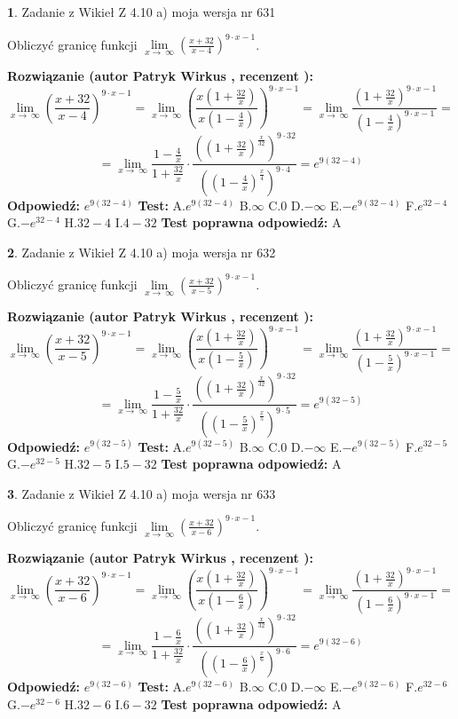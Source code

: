 \documentclass[12pt, a4paper]{article}
\theoremstyle{definition} %
\newtheorem{zad}{}
\newcommand{\zadStart}[1]{\begin{zad}#1\newline}
\newcommand{\zadStop}{\end{zad}}
\newcommand{\rozwStart}[2]{\noindent \textbf{Rozwiązanie (autor #1 , recenzent #2): }\newline}
\newcommand{\rozwStop}{\newline}
\newcommand{\odpStart}{\noindent \textbf{Odpowiedź:}\newline}
\newcommand{\odpStop}{\newline}
\newcommand{\testStart}{\noindent \textbf{Test:}\newline}
\newcommand{\testStop}{\newline}
\newcommand{\kluczStart}{\noindent \textbf{Test poprawna odpowiedź:}\newline}
\newcommand{\kluczStop}{\newline}
\begin{document}
\zadStart{Zadanie z Wikieł Z 4.10 a) moja wersja nr 631}


Obliczyć granicę funkcji  $\lim\limits_{x\to\ \infty}(\frac{x+32}{x-4})^{9\cdot x-1}$.
\zadStop
\rozwStart{Patryk Wirkus}{}
$$\lim\limits_{x\to\ \infty}(\frac{x+32}{x-4})^{9\cdot x-1} = \lim\limits_{x\to\ \infty}(\frac{x(1+\frac{32}{x})}{x(1-\frac{4}{x})})^{9\cdot x-1}=\lim\limits_{x\to\ \infty}\frac{(1+\frac{32}{x})^{9\cdot x-1}}{(1-\frac{4}{x})^{9\cdot x-1}}=$$
$$=\lim\limits_{x\to\ \infty}\frac{1-\frac{4}{x}}{1+\frac{32}{x}}\cdot\frac{((1+\frac{32}{x})^{\frac{x}{32}})^{9\cdot32}}{((1-\frac{4}{x})^{\frac{x}{4}})^{9\cdot4}}=e^{9(32-4)}$$
\rozwStop
\odpStart
$e^{9(32-4)}$
\odpStop
\testStart
A.$e^{9(32-4)}$ B.$\infty$ C.$0$ D.$-\infty$ E.$-e^{9(32-4)}$
F.$e^{32-4}$ G.$-e^{32-4}$
H.$32-4$
I.$4-32$
\testStop
\kluczStart
A
\kluczStop



\zadStart{Zadanie z Wikieł Z 4.10 a) moja wersja nr 632}


Obliczyć granicę funkcji  $\lim\limits_{x\to\ \infty}(\frac{x+32}{x-5})^{9\cdot x-1}$.
\zadStop
\rozwStart{Patryk Wirkus}{}
$$\lim\limits_{x\to\ \infty}(\frac{x+32}{x-5})^{9\cdot x-1} = \lim\limits_{x\to\ \infty}(\frac{x(1+\frac{32}{x})}{x(1-\frac{5}{x})})^{9\cdot x-1}=\lim\limits_{x\to\ \infty}\frac{(1+\frac{32}{x})^{9\cdot x-1}}{(1-\frac{5}{x})^{9\cdot x-1}}=$$
$$=\lim\limits_{x\to\ \infty}\frac{1-\frac{5}{x}}{1+\frac{32}{x}}\cdot\frac{((1+\frac{32}{x})^{\frac{x}{32}})^{9\cdot32}}{((1-\frac{5}{x})^{\frac{x}{5}})^{9\cdot5}}=e^{9(32-5)}$$
\rozwStop
\odpStart
$e^{9(32-5)}$
\odpStop
\testStart
A.$e^{9(32-5)}$ B.$\infty$ C.$0$ D.$-\infty$ E.$-e^{9(32-5)}$
F.$e^{32-5}$ G.$-e^{32-5}$
H.$32-5$
I.$5-32$
\testStop
\kluczStart
A
\kluczStop



\zadStart{Zadanie z Wikieł Z 4.10 a) moja wersja nr 633}


Obliczyć granicę funkcji  $\lim\limits_{x\to\ \infty}(\frac{x+32}{x-6})^{9\cdot x-1}$.
\zadStop
\rozwStart{Patryk Wirkus}{}
$$\lim\limits_{x\to\ \infty}(\frac{x+32}{x-6})^{9\cdot x-1} = \lim\limits_{x\to\ \infty}(\frac{x(1+\frac{32}{x})}{x(1-\frac{6}{x})})^{9\cdot x-1}=\lim\limits_{x\to\ \infty}\frac{(1+\frac{32}{x})^{9\cdot x-1}}{(1-\frac{6}{x})^{9\cdot x-1}}=$$
$$=\lim\limits_{x\to\ \infty}\frac{1-\frac{6}{x}}{1+\frac{32}{x}}\cdot\frac{((1+\frac{32}{x})^{\frac{x}{32}})^{9\cdot32}}{((1-\frac{6}{x})^{\frac{x}{6}})^{9\cdot6}}=e^{9(32-6)}$$
\rozwStop
\odpStart
$e^{9(32-6)}$
\odpStop
\testStart
A.$e^{9(32-6)}$ B.$\infty$ C.$0$ D.$-\infty$ E.$-e^{9(32-6)}$
F.$e^{32-6}$ G.$-e^{32-6}$
H.$32-6$
I.$6-32$
\testStop
\kluczStart
A
\kluczStop
\end{document}
